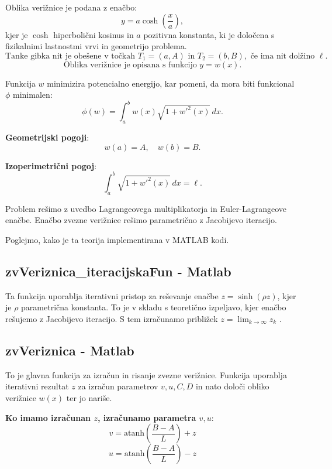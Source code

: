 \documentclass{article}
\begin{document}
    Oblika verižnice je podana z enačbo:
        \[
        y = a \cosh\left(\frac{x}{a}\right),
        \]
        kjer je \( \cosh \) hiperbolični kosinus in \( a \) pozitivna konstanta, ki je določena s fizikalnimi lastnostmi vrvi in geometrijo problema.        
        \[
        \text{Tanke gibka nit je obešene v točkah } T_1 = (a, A) \text{ in } T_2 = (b, B), \text{ če ima nit dolžino } \ell.
        \]
        \[
        \text{Oblika verižnice je opisana s funkcijo } y = w(x).
        \]
    
        Funkcija \( w \) minimizira potencialno energijo, kar pomeni, da mora biti funkcional \( \phi \) minimalen:
        \[
        \phi(w) = \int_a^b w(x) \sqrt{1 + w'^2(x)} \, dx.
        \]
    
        \textbf{Geometrijski pogoji}:
        \[
        w(a) = A, \quad w(b) = B.
        \]
    
        \textbf{Izoperimetrični pogoj}:
        \[
        \int_a^b \sqrt{1 + w'^2(x)} \, dx = \ell.
        \]

    Problem rešimo z uvedbo Lagrangeovega multiplikatorja in Euler-Lagrangeove enačbe. Enačbo zvezne verižnice rešimo parametrično z Jacobijevo iteracijo.
        
        Poglejmo, kako je ta teorija implementirana v MATLAB kodi.
        
        \subsection*{zvVeriznica\_iteracijskaFun - Matlab}      
        Ta funkcija uporablja iterativni pristop za reševanje enačbe \( z = \sinh(\rho z) \), kjer je \( \rho \) parametrična konstanta. To je v skladu s teoretično izpeljavo, kjer enačbo rešujemo z Jacobijevo iteracijo.
        S tem izračunamo približek \( z = \lim_{k \to \infty} z_k \) .
 

        
        \subsection*{zvVeriznica - Matlab}
        To je glavna funkcija za izračun in risanje zvezne verižnice. Funkcija uporablja iterativni rezultat \( z \) za izračun parametrov \( v, u, C, D \) in nato določi obliko verižnice \( w(x) \) ter jo nariše. 
        

        \textbf{Ko imamo izračunan \( z \), izračunamo parametra \( v, u \)}:
        \[
        v = \text{atanh}\left(\frac{B - A}{L}\right) + z
        \]
        \[
        u = \text{atanh}\left(\frac{B - A}{L}\right) - z
        \]
    
\end{document}
